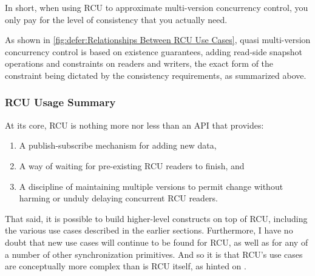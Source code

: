 In short, when using RCU to approximate multi-version concurrency control,
you only pay for the level of consistency that you actually need.

As shown in \cref{fig:defer:Relationships Between RCU Use Cases},
quasi multi-version concurrency control is based on existence guarantees,
adding read-side snapshot operations and constraints on readers and
writers, the exact form of the constraint being dictated by the
consistency requirements, as summarized above.

\subsubsection{RCU Usage Summary}
\label{sec:defer:RCU Usage Summary}

At its core, RCU is nothing more nor less than an API that provides:

\begin{enumerate}
\item	A publish-subscribe mechanism for adding new data,
\item	A way of waiting for pre-existing RCU readers to finish, and
\item	A discipline of maintaining multiple versions to permit change
	without harming or unduly delaying concurrent RCU readers.
\end{enumerate}

That said, it is possible to build higher-level constructs on top of RCU,
including the various use cases described in the earlier sections.
Furthermore, I have no doubt that new use cases will continue to be
found for RCU, as well as for any of a number of other synchronization
primitives.
And so it is that RCU's use cases are conceptually more complex than
is RCU itself, as hinted on
.

\QuickQuizEnd

